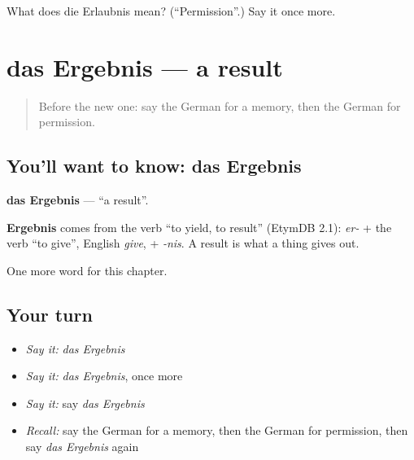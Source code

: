 \begin{tcolorbox}[breakable,colback=teal!4,colframe=teal!35!black,title={Before you move on}]
What does die Erlaubnis mean? (\textquotedblleft{}Permission\textquotedblright{}.) Say it once more.
\end{tcolorbox}
\section[das Ergebnis]{das Ergebnis — a result}

\label{lesson:GE-C228-ergebnis}



\begin{quote}
Before the new one: say the German for a memory, then the German for permission.
\end{quote}

\subsection*{You'll want to know: das Ergebnis}
\textbf{das Ergebnis} — \textquotedblleft{}a result\textquotedblright{}.

\begin{cousinweb}
\textbf{Ergebnis} comes from the verb \textquotedblleft{}to yield, to result\textquotedblright{} (EtymDB 2.1): \emph{er-} + the verb \textquotedblleft{}to give\textquotedblright{}, English \emph{give}, + \emph{-nis}. A result is what a thing gives out.
\end{cousinweb}

\begin{grammarlens}[title={What you've built}]
One more word for this chapter.
\end{grammarlens}

\subsection*{Your turn}
\begin{itemize}
\raggedright
  \item \emph{Say it:} \emph{das Ergebnis}
  \item \emph{Say it:} \emph{das Ergebnis}, once more
  \item \emph{Say it:} say \emph{das Ergebnis}
  \item \emph{Recall:} say the German for a memory, then the German for permission, then say \emph{das Ergebnis} again
\end{itemize}

